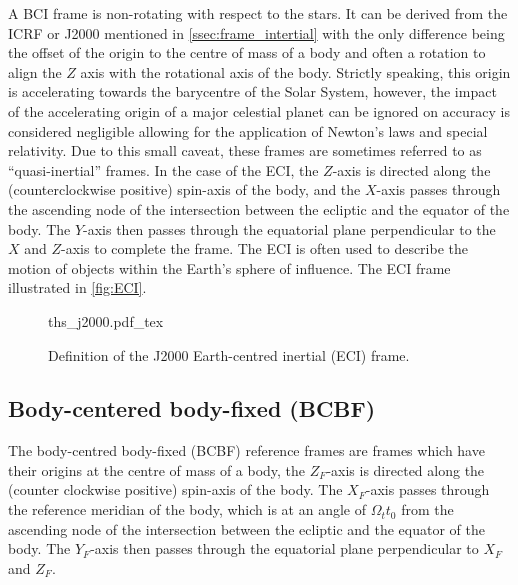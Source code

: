 A \Gls{BCI} frame is non-rotating with respect to the stars. It can be derived from the \gls{ICRF} or J2000 mentioned in \autoref{ssec:frame_intertial} with the only difference being the offset of the origin to the centre of mass of a body and often a rotation to align the $Z$ axis with the rotational axis of the body. Strictly speaking, this origin is accelerating towards the barycentre of the Solar System, however, the impact of the accelerating origin of a major celestial planet can be ignored on accuracy is considered negligible allowing for the application of Newton's laws and special relativity. Due to this small caveat, these frames are sometimes referred to as ``quasi-inertial'' frames. In the case of the \gls{ECI}, the $Z$-axis is directed along the (counterclockwise positive) spin-axis of the body, and the $X$-axis passes through the ascending node of the intersection between the ecliptic and the equator of the body. The $Y$-axis then passes through the equatorial plane perpendicular to the $X$ and $Z$-axis to complete the frame. The \gls{ECI} is often used to describe the motion of objects within the Earth's sphere of influence. The \gls{ECI} frame illustrated in \autoref{fig:ECI}.

\begin{figure}[H]
    \centering
    \def\svgwidth{0.72\linewidth}
    {ths_j2000.pdf_tex}
    \caption{Definition of the J2000 Earth-centred inertial (ECI) frame.}
    \label{fig:ECI}
\end{figure}

\subsection{Body-centered body-fixed (BCBF)\label{ssec:frame_bcbf}}

The body-centred body-fixed (BCBF) reference frames are frames which have their origins at the centre of mass of a body, the $Z_F$-axis is directed along the (counter clockwise positive) spin-axis of the body. The $X_F$-axis passes through the reference meridian of the body, which is at an angle of $\Omega_t{t_0}$ from the ascending node of the intersection between the ecliptic and the equator of the body. The $Y_F$-axis then passes through the equatorial plane perpendicular to $X_F$ and $Z_F$.

